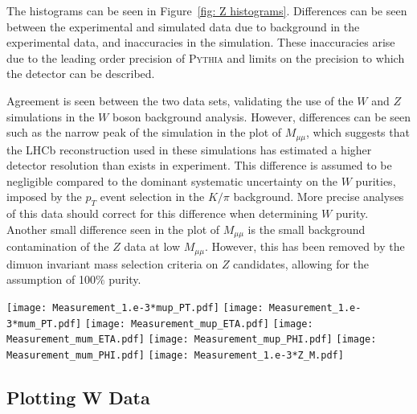 \documentclass[a4paper,12pt]{article}
\begin{document}
The histograms can be seen in Figure~\ref{fig: Z histograms}.
Differences can be seen between the experimental and simulated data due to background in the experimental data, and inaccuracies in the simulation. These inaccuracies arise due to the leading order precision of \textsc{Pythia} and limits on the precision to which the detector can be described. 

Agreement is seen between the two data sets, validating the use of the $W$ and $Z$ simulations in the $W$ boson background analysis. However, differences can be seen such as the narrow peak of the simulation in the plot of $M_{\mu\mu}$, which suggests that the LHCb reconstruction used in these simulations has estimated a higher detector resolution than exists in experiment. This difference is assumed to be negligible compared to the dominant systematic uncertainty on the $W$ purities, imposed by the $p_T$ event selection in the $K/\pi$ background. More precise analyses of this data should correct for this difference when determining $W$ purity.
Another small difference seen in the plot of $M_{\mu\mu}$ is the small background contamination of the $Z$ data at low $M_{\mu\mu}$. However, this has been removed by the dimuon invariant mass selection criteria on $Z$ candidates, allowing for the assumption of 100$\%$ purity.

\begin{figure*}[p]
\centering
\texttt{[image: Measurement\_1.e-3*mup\_PT.pdf]}
\texttt{[image: Measurement\_1.e-3*mum\_PT.pdf]}
\texttt{[image: Measurement\_mup\_ETA.pdf]}
\texttt{[image: Measurement\_mum\_ETA.pdf]}
\texttt{[image: Measurement\_mup\_PHI.pdf]}
\texttt{[image: Measurement\_mum\_PHI.pdf]}
\texttt{[image: Measurement\_1.e-3*Z\_M.pdf]}
\vspace{-4mm}
\caption{\small Comparison of $Z$ experimental data with a Monte Carlo simulation with detector reconstruction. Plots are shown for both positive and negative muons, plotting $M_{\mu\mu}$, $p_T$, $\eta$, and $\phi$.}
\label{fig: Z histograms}
\end{figure*}


\subsection{Plotting W Data} \label{sec: W plotting}
\end{document}
